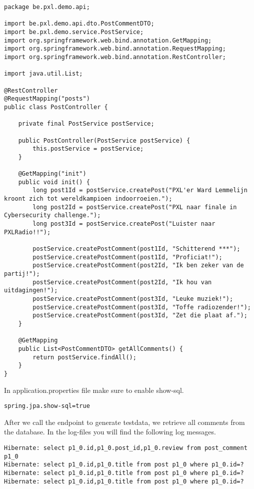 \begin{lstlisting}
package be.pxl.demo.api;

import be.pxl.demo.api.dto.PostCommentDTO;
import be.pxl.demo.service.PostService;
import org.springframework.web.bind.annotation.GetMapping;
import org.springframework.web.bind.annotation.RequestMapping;
import org.springframework.web.bind.annotation.RestController;

import java.util.List;

@RestController
@RequestMapping("posts")
public class PostController {

    private final PostService postService;

    public PostController(PostService postService) {
        this.postService = postService;
    }

    @GetMapping("init")
    public void init() {
        long post1Id = postService.createPost("PXL'er Ward Lemmelijn kroont zich tot wereldkampioen indoorroeien.");
        long post2Id = postService.createPost("PXL naar finale in Cybersecurity challenge.");
        long post3Id = postService.createPost("Luister naar PXLRadio!!");

        postService.createPostComment(post1Id, "Schitterend ***");
        postService.createPostComment(post1Id, "Proficiat!");
        postService.createPostComment(post2Id, "Ik ben zeker van de partij!");
        postService.createPostComment(post2Id, "Ik hou van uitdagingen!");
        postService.createPostComment(post3Id, "Leuke muziek!");
        postService.createPostComment(post3Id, "Toffe radiozender!");
        postService.createPostComment(post3Id, "Zet die plaat af.");
    }

    @GetMapping
    public List<PostCommentDTO> getAllComments() {
        return postService.findAll();
    }
}
\end{lstlisting}

In application.properties file make sure to enable show-sql.

\begin{lstlisting}
spring.jpa.show-sql=true
\end{lstlisting}

After we call the endpoint to generate testdata, we retrieve all comments from the database.
In the log-files you will find the following log messages.

\begin{lstlisting}
Hibernate: select p1_0.id,p1_0.post_id,p1_0.review from post_comment p1_0
Hibernate: select p1_0.id,p1_0.title from post p1_0 where p1_0.id=?
Hibernate: select p1_0.id,p1_0.title from post p1_0 where p1_0.id=?
Hibernate: select p1_0.id,p1_0.title from post p1_0 where p1_0.id=?
\end{lstlisting}

